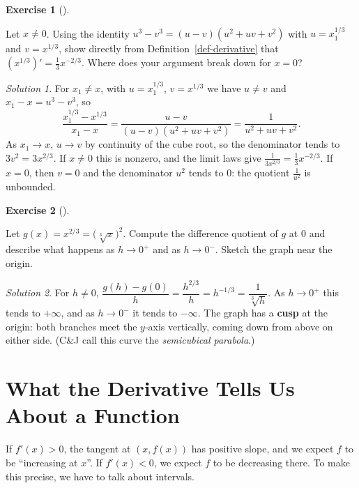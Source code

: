 \documentclass[
  letterpaper,
  DIV=11,
  numbers=noendperiod]{scrreprt}
\theoremstyle{plain}
\theoremstyle{plain}
\theoremstyle{definition}
\theoremstyle{definition}
\newtheorem{exercise}{Exercise}[chapter]
\theoremstyle{definition}
\theoremstyle{plain}
\theoremstyle{plain}
\theoremstyle{remark}
\newtheorem*{solution}{Solution}
\begin{document}
\begin{exercise}[]\protect\hypertarget{exr-cube-root-derivative}{}\label{exr-cube-root-derivative}

Let \(x\neq 0\). Using the identity \(u^3-v^3 = (u-v)(u^2+uv+v^2)\) with
\(u=x_1^{1/3}\) and \(v=x^{1/3}\), show directly from
Definition~\ref{def-derivative} that \((x^{1/3})' = \frac13x^{-2/3}\).
Where does your argument break down for \(x=0\)?

\end{exercise}

\begin{solution}
For \(x_1\neq x\), with \(u=x_1^{1/3}\), \(v=x^{1/3}\) we have
\(u\neq v\) and \(x_1-x=u^3-v^3\), so \[
\frac{x_1^{1/3}-x^{1/3}}{x_1-x} = \frac{u-v}{(u-v)(u^2+uv+v^2)} = \frac{1}{u^2+uv+v^2}.
\] As \(x_1\to x\), \(u\to v\) by continuity of the cube root, so the
denominator tends to \(3v^2 = 3x^{2/3}\). If \(x\neq0\) this is nonzero,
and the limit laws give \(\frac{1}{3x^{2/3}} = \frac13x^{-2/3}\). If
\(x=0\), then \(v=0\) and the denominator \(u^2\) tends to \(0\): the
quotient \(\frac{1}{u^2}\) is unbounded.
\end{solution}

\begin{exercise}[]\protect\hypertarget{exr-cusp}{}\label{exr-cusp}

Let \(g(x) = x^{2/3} = \big(\sqrt[3]{x}\big)^2\). Compute the difference
quotient of \(g\) at \(0\) and describe what happens as \(h\to0^+\) and
as \(h\to0^-\). Sketch the graph near the origin.

\end{exercise}

\begin{solution}
For \(h\neq0\),
\(\dfrac{g(h)-g(0)}{h} = \dfrac{h^{2/3}}{h} = h^{-1/3} = \dfrac{1}{\sqrt[3]{h}}\).
As \(h\to0^+\) this tends to \(+\infty\), and as \(h\to0^-\) it tends to
\(-\infty\). The graph has a \textbf{cusp} at the origin: both branches
meet the \(y\)-axis vertically, coming down from above on either side.
(C\&J call this curve the \emph{semicubical parabola}.)
\end{solution}

\section{What the Derivative Tells Us About a
Function}\label{what-the-derivative-tells-us-about-a-function}

If \(f'(x)>0\), the tangent at \((x,f(x))\) has positive slope, and we
expect \(f\) to be ``increasing at \(x\)''. If \(f'(x)<0\), we expect
\(f\) to be decreasing there. To make this precise, we have to talk
about intervals.
\end{document}
